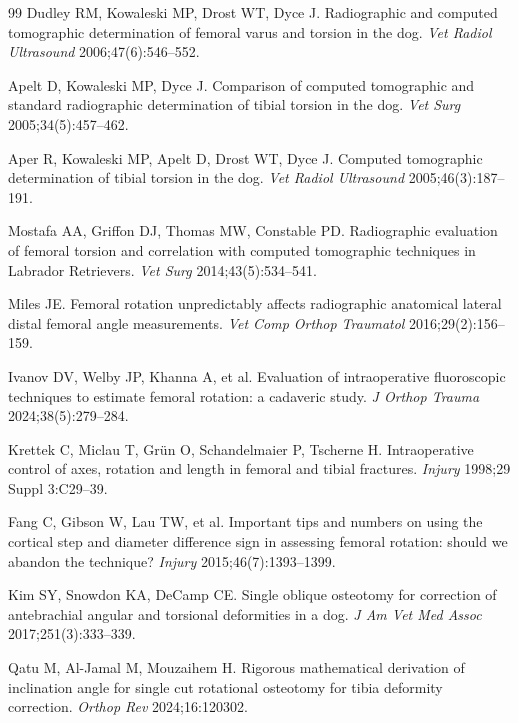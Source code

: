 \begin{thebibliography}{99}
 Dudley RM, Kowaleski MP, Drost WT, Dyce J. Radiographic and computed tomographic determination of
femoral varus and torsion in the dog. \emph{Vet Radiol Ultrasound} 2006;47(6):546--552.

 Apelt D, Kowaleski MP, Dyce J. Comparison of computed tomographic and standard radiographic
determination of tibial torsion in the dog. \emph{Vet Surg} 2005;34(5):457--462. 

 Aper R, Kowaleski MP, Apelt D, Drost WT, Dyce J. Computed tomographic determination of tibial
torsion in the dog. \emph{Vet Radiol Ultrasound} 2005;46(3):187--191. 

 Mostafa AA, Griffon DJ, Thomas MW, Constable PD. Radiographic evaluation of femoral torsion and
correlation with computed tomographic techniques in Labrador Retrievers. \emph{Vet Surg} 2014;43(5):534--541.

 Miles JE. Femoral rotation unpredictably affects radiographic anatomical lateral distal femoral
angle measurements. \emph{Vet Comp Orthop Traumatol} 2016;29(2):156--159. 

 Ivanov DV, Welby JP, Khanna A, et al. Evaluation of intraoperative fluoroscopic techniques to
estimate femoral rotation: a cadaveric study. \emph{J Orthop Trauma} 2024;38(5):279--284.

 Krettek C, Miclau T, Grün O, Schandelmaier P, Tscherne H. Intraoperative control of axes,
rotation and length in femoral and tibial fractures. \emph{Injury} 1998;29 Suppl 3:C29--39.

 Fang C, Gibson W, Lau TW, et al. Important tips and numbers on using the cortical step and diameter
difference sign in assessing femoral rotation: should we abandon the technique? \emph{Injury} 2015;46(7):1393--1399.

 Kim SY, Snowdon KA, DeCamp CE. Single oblique osteotomy for correction of antebrachial angular and
torsional deformities in a dog. \emph{J Am Vet Med Assoc} 2017;251(3):333--339. 

 Qatu M, Al-Jamal M, Mouzaihem H. Rigorous mathematical derivation of inclination angle for single
cut rotational osteotomy for tibia deformity correction. \emph{Orthop Rev} 2024;16:120302. 


\end{thebibliography}
